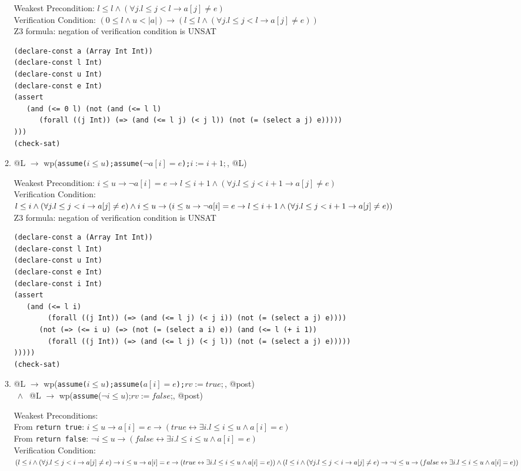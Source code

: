 \documentclass{article}
\begin{document}
\begin{enumerate}
\begin{enumerate}[(1)]
		Weakest Precondition: $l \leq l \land (\forall j. l\leq j < l \to a[j] \neq e)$\\
		Verification Condition:
		$(0 \leq l \land u < |a|) \to (l \leq l \land (\forall j. l\leq j < l\to a[j] \neq e))$\\
		Z3 formula: negation of verification condition is UNSAT
\begin{verbatim}
(declare-const a (Array Int Int))
(declare-const l Int)
(declare-const u Int)
(declare-const e Int)
(assert
   (and (<= 0 l) (not (and (<= l l) 
      (forall ((j Int)) (=> (and (<= l j) (< j l)) (not (= (select a j) e)))))
)))
(check-sat)
\end{verbatim}

\item @L $\to$ wp(\verb|assume(|$i\leq u$\verb|);assume(|$\neg a[i]=e$\verb|);|$i:=i+1;$, @L)

	Weakest Precondition:
	$i\leq u \to \neg a[i]=e \to l \leq i+1 \land (\forall j. l\leq j < i+1 \to a[j] \neq e)$\\
	Verification Condition:\\
	$l \leq i \land (\forall j. l\leq j < i \to a[j] \neq e) \land i\leq u \\
	\to (i\leq u \to \neg a[i]=e \to l \leq i+1 \land (\forall j. l\leq j < i+1 \to a[j] \neq e))$\\
	Z3 formula: negation of verification condition is UNSAT
\begin{verbatim}
(declare-const a (Array Int Int))
(declare-const l Int)
(declare-const u Int)
(declare-const e Int)
(declare-const i Int)
(assert
   (and (<= l i)
        (forall ((j Int)) (=> (and (<= l j) (< j i)) (not (= (select a j) e)))) 
      (not (=> (<= i u) (=> (not (= (select a i) e)) (and (<= l (+ i 1)) 
        (forall ((j Int)) (=> (and (<= l j) (< j l)) (not (= (select a j) e)))))
)))))
(check-sat)
\end{verbatim}

\item @L $\to$ wp(\verb|assume(|$i\leq u$\verb|);assume(|$a[i]=e$\verb|);|$rv:=true;$, @post) \\
    $\ \land\ $ @L $\to$ wp(\verb|assume|($\neg i\leq u$);$rv:=false$;, @post)

	Weakest Preconditions: \\
	From \verb|return true|:  $i\leq u \to a[i]=e \to (true \leftrightarrow \exists i. l \leq i \leq u \land a[i] = e)$\\
	From \verb|return false|: $\neg i\leq u \to (false \leftrightarrow \exists i. l \leq i \leq u \land a[i] = e)$\\
	Verification Condition:\\
	$(l \leq i \land (\forall j. l\leq j < i \to a[j] \neq e)
	\to i\leq u \to a[i]=e \to (true \leftrightarrow \exists i. l \leq i \leq u \land a[i] = e)) \\
	\land (l \leq i \land (\forall j. l\leq j < i \to a[j] \neq e)
	\to \neg i\leq u \to (false \leftrightarrow \exists i. l \leq i \leq u \land a[i] = e))$


\end{enumerate}
\end{enumerate}
\end{document}
